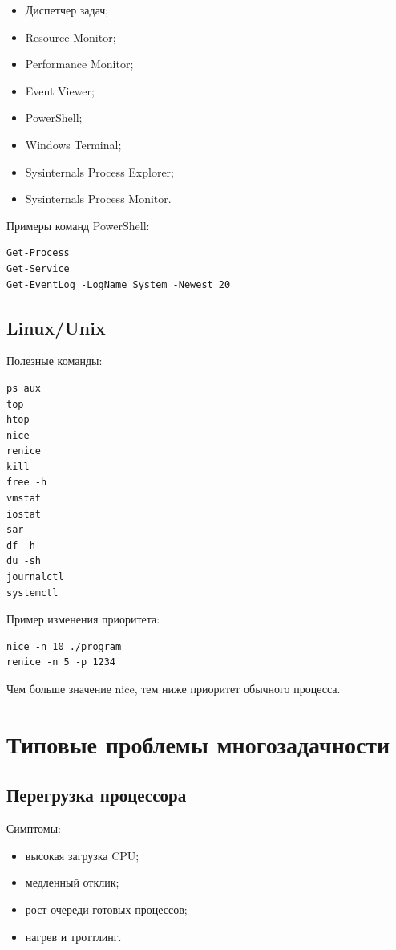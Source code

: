 \documentclass[12pt,a4paper]{article}
\begin{document}
\begin{itemize}
    \item Диспетчер задач;
    \item Resource Monitor;
    \item Performance Monitor;
    \item Event Viewer;
    \item PowerShell;
    \item Windows Terminal;
    \item Sysinternals Process Explorer;
    \item Sysinternals Process Monitor.
\end{itemize}

Примеры команд PowerShell:

\begin{lstlisting}[style=code]
Get-Process
Get-Service
Get-EventLog -LogName System -Newest 20
\end{lstlisting}

\subsection{Linux/Unix}

Полезные команды:

\begin{lstlisting}[style=code]
ps aux
top
htop
nice
renice
kill
free -h
vmstat
iostat
sar
df -h
du -sh
journalctl
systemctl
\end{lstlisting}

Пример изменения приоритета:

\begin{lstlisting}[style=code]
nice -n 10 ./program
renice -n 5 -p 1234
\end{lstlisting}

Чем больше значение nice, тем ниже приоритет обычного процесса.

\section{Типовые проблемы многозадачности}

\subsection{Перегрузка процессора}

Симптомы:

\begin{itemize}
    \item высокая загрузка CPU;
    \item медленный отклик;
    \item рост очереди готовых процессов;
    \item нагрев и троттлинг.
\end{itemize}
\end{document}
